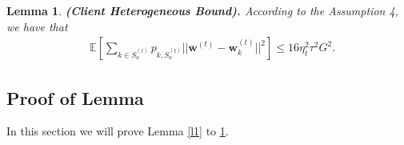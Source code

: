 \documentclass[10pt,journal,compsoc]{IEEEtran}
\newtheorem{lemma}{Lemma}
\newcommand{\w}{\mathbf{w}}
\newcommand{\s}{S_a^{(t)}}
\begin{document}
\begin{lemma}\label{l4}
\textbf{(Client Heterogeneous Bound).} \textit{According to the Assumption 4, we have that}
\begin{equation}
\begin{split}
&\mathbb{E}[\sum_{k \in \s}p_{k,\s}||\overline{\w}^{(t)}-\w_k^{(t)}||^2] \leq 16\eta_t^2\tau^2G^2.
\end{split}
\end{equation}
\end{lemma}


\subsection{Proof of Lemma}

In this section we will prove Lemma \ref{l1} to \ref{l4}. 
\end{document}
